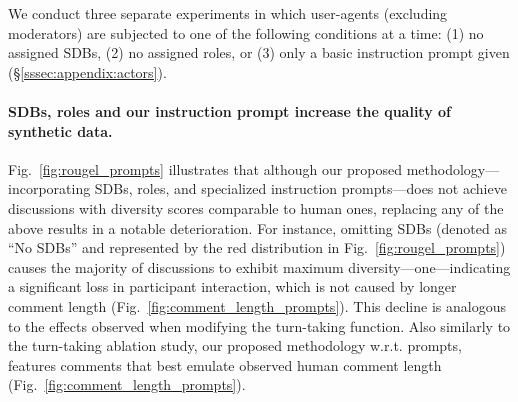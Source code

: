 We conduct three separate experiments in which user-agents (excluding moderators) are subjected to one of the following conditions at a time: (1) no assigned \acp{SDB}, (2) no assigned roles, or (3) only a basic instruction prompt given (\S\ref{sssec:appendix:actors}). 

\paragraph{\acp{SDB}, roles and our instruction prompt increase the quality of synthetic data.} Fig.~\ref{fig:rougel_prompts} illustrates that although our proposed methodology---incorporating \acp{SDB}, roles, and specialized instruction prompts---does not achieve discussions with diversity scores comparable to human ones, replacing any of the above results in a notable deterioration. For instance, omitting \acp{SDB} (denoted as ``No \acp{SDB}'' and represented by the red distribution in Fig.~\ref{fig:rougel_prompts}) causes the majority of discussions to exhibit maximum diversity---one---indicating a significant loss in participant interaction, which is not caused by longer comment length (Fig.~\ref{fig:comment_length_prompts}). This decline is analogous to the effects observed when modifying the turn-taking function. Also similarly to the turn-taking ablation study, our proposed methodology w.r.t. prompts, features comments that best emulate observed human comment length (Fig.~\ref{fig:comment_length_prompts}).
